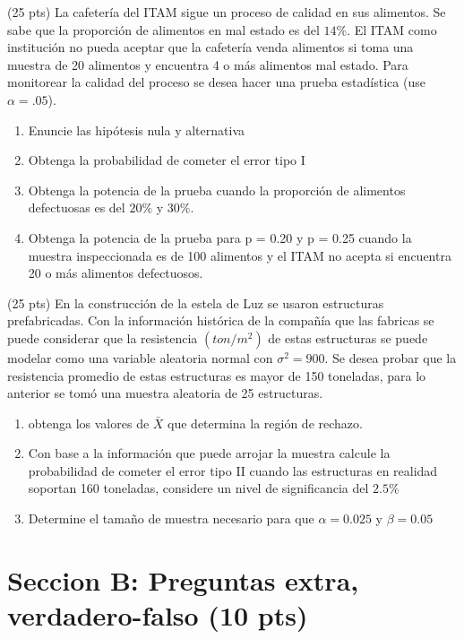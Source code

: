 \documentclass[addpoints]{exam}
\theoremstyle{mytheor}
\begin{document}
\begin{questions}
  
  \question (25 pts) 
  La cafetería del ITAM sigue un proceso de calidad en sus alimentos. Se sabe que la proporción de alimentos en mal estado es del $14\%$. El ITAM como institución no pueda aceptar que la cafetería venda alimentos si toma una muestra de 20 alimentos y encuentra 4 o más alimentos mal estado. Para monitorear la calidad del proceso se desea hacer una prueba estadística (use $\alpha = .05$). 
  
  \begin{enumerate}
  \item Enuncie las hipótesis nula y alternativa
  \item Obtenga la probabilidad de cometer el error tipo I 
  \item Obtenga la potencia de la prueba cuando la proporción de alimentos defectuosas es del $20\%$ y $30\%$. 
  \item Obtenga la potencia de la prueba para p = 0.20 y p = 0.25 cuando la muestra inspeccionada es de 100 alimentos y el ITAM no acepta si encuentra 20 o más alimentos defectuosos.
  \end{enumerate}
 
  
  \question (25 pts) 
  En la construcción de la estela de Luz se usaron estructuras prefabricadas. Con la información histórica de la compañía que las fabricas se puede considerar que la resistencia $(ton/m^2)$ de estas estructuras se puede modelar como una variable aleatoria normal con $\sigma^2 = 900$. Se desea probar que la resistencia promedio de estas estructuras es mayor de 150 toneladas, para lo anterior se tomó una muestra aleatoria de 25 estructuras. 
  \begin{enumerate}
  \item obtenga los valores de $\bar{X}$ que determina la región de rechazo. 
  \item Con base a la información que puede arrojar la muestra calcule la probabilidad de cometer el error tipo II cuando las estructuras en realidad soportan 160 toneladas, considere un nivel de significancia del $2.5\%$
  \item Determine el tamaño de muestra necesario para que $\alpha = 0.025$ y $\beta = 0.05$

  \end{enumerate}
  \end{questions}
  
  
  \section*{Seccion B: Preguntas extra, verdadero-falso (10 pts)}
  
\end{document}
